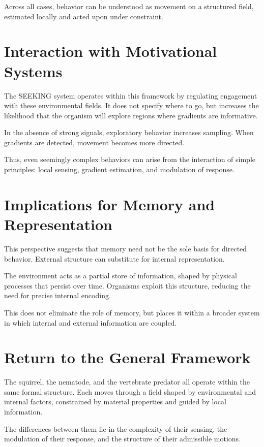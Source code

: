 \documentclass[11pt,oneside]{book}
\begin{document}
Across all cases, behavior can be understood as movement on a structured field, estimated locally and acted upon under constraint.

\section{Interaction with Motivational Systems}

The SEEKING system operates within this framework by regulating engagement with these environmental fields. It does not specify where to go, but increases the likelihood that the organism will explore regions where gradients are informative.

In the absence of strong signals, exploratory behavior increases sampling. When gradients are detected, movement becomes more directed.

Thus, even seemingly complex behaviors can arise from the interaction of simple principles: local sensing, gradient estimation, and modulation of response.

\section{Implications for Memory and Representation}

This perspective suggests that memory need not be the sole basis for directed behavior. External structure can substitute for internal representation.

The environment acts as a partial store of information, shaped by physical processes that persist over time. Organisms exploit this structure, reducing the need for precise internal encoding.

This does not eliminate the role of memory, but places it within a broader system in which internal and external information are coupled.

\section{Return to the General Framework}

The squirrel, the nematode, and the vertebrate predator all operate within the same formal structure. Each moves through a field shaped by environmental and internal factors, constrained by material properties and guided by local information.

The differences between them lie in the complexity of their sensing, the modulation of their response, and the structure of their admissible motions.
\end{document}
